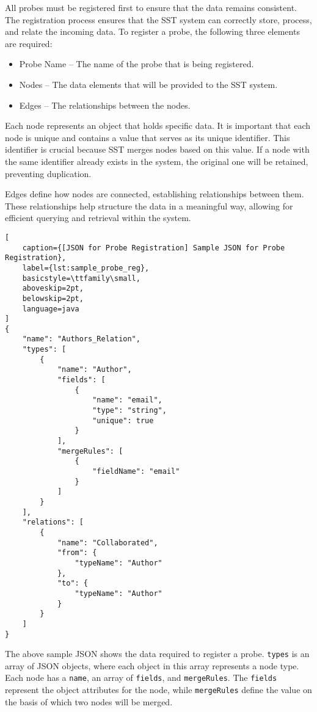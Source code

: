 All probes must be registered first to ensure that the data remains consistent. The registration process ensures that the SST system can correctly store, process, and relate the incoming data. To register a probe, the following three elements are required:

\begin{itemize}
    \item Probe Name – The name of the probe that is being registered.
    \item Nodes – The data elements that will be provided to the SST system.
    \item Edges – The relationships between the nodes.
\end{itemize}

Each node represents an object that holds specific data. It is important that each node is unique and contains a value that serves as its unique identifier. This identifier is crucial because SST merges nodes based on this value. If a node with the same identifier already exists in the system, the original one will be retained, preventing duplication.

Edges define how nodes are connected, establishing relationships between them. These relationships help structure the data in a meaningful way, allowing for efficient querying and retrieval within the system.
\begin{lstlisting}[
    caption={[JSON for Probe Registration] Sample JSON for Probe Registration}, 
    label={lst:sample_probe_reg},
    basicstyle=\ttfamily\small,
    aboveskip=2pt,
    belowskip=2pt,
    language=java
]
{
    "name": "Authors_Relation",
    "types": [
        {
            "name": "Author",
            "fields": [
                {
                    "name": "email",
                    "type": "string",
                    "unique": true
                }
            ],
            "mergeRules": [
                {
                    "fieldName": "email"
                }
            ]
        }
    ],
    "relations": [
        {
            "name": "Collaborated",
            "from": {
                "typeName": "Author"
            },
            "to": {
                "typeName": "Author"
            }
        }
    ]
}
\end{lstlisting}

The above sample JSON shows the data required to register a probe. \texttt{types} is an array of JSON objects, where each object in this array represents a node type. Each node has a \texttt{name}, an array of \texttt{fields}, and \texttt{mergeRules}. The \texttt{fields} represent the object attributes for the node, while \texttt{mergeRules} define the value on the basis of which two nodes will be merged.  


